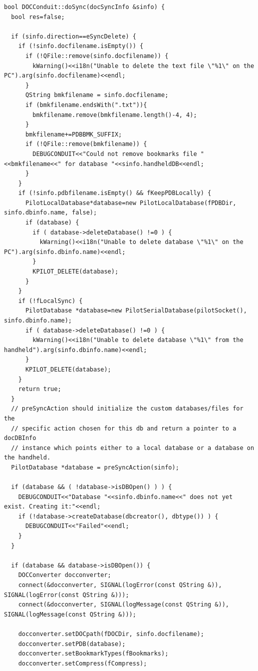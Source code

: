 \documentclass[10pt,a4paper]{article}
\begin{document}
{\footnotesize
\begin{verbatim}
bool DOCConduit::doSync(docSyncInfo &sinfo) {
  bool res=false;
  
  if (sinfo.direction==eSyncDelete) {
    if (!sinfo.docfilename.isEmpty()) {
      if (!QFile::remove(sinfo.docfilename)) {
        kWarning()<<i18n("Unable to delete the text file \"%1\" on the PC").arg(sinfo.docfilename)<<endl;
      }
      QString bmkfilename = sinfo.docfilename;
      if (bmkfilename.endsWith(".txt")){
        bmkfilename.remove(bmkfilename.length()-4, 4);
      }
      bmkfilename+=PDBBMK_SUFFIX;
      if (!QFile::remove(bmkfilename)) {
        DEBUGCONDUIT<<"Could not remove bookmarks file "<<bmkfilename<<" for database "<<sinfo.handheldDB<<endl;
      }
    }
    if (!sinfo.pdbfilename.isEmpty() && fKeepPDBLocally) {
      PilotLocalDatabase*database=new PilotLocalDatabase(fPDBDir, sinfo.dbinfo.name, false);
      if (database) {
        if ( database->deleteDatabase() !=0 ) {
          kWarning()<<i18n("Unable to delete database \"%1\" on the PC").arg(sinfo.dbinfo.name)<<endl;
        }
        KPILOT_DELETE(database);
      }
    }
    if (!fLocalSync) {
      PilotDatabase *database=new PilotSerialDatabase(pilotSocket(), sinfo.dbinfo.name);
      if ( database->deleteDatabase() !=0 ) {
        kWarning()<<i18n("Unable to delete database \"%1\" from the handheld").arg(sinfo.dbinfo.name)<<endl;
      }
      KPILOT_DELETE(database);
    }
    return true;
  }
  // preSyncAction should initialize the custom databases/files for the
  // specific action chosen for this db and return a pointer to a docDBInfo
  // instance which points either to a local database or a database on the handheld.
  PilotDatabase *database = preSyncAction(sinfo);

  if (database && ( !database->isDBOpen() ) ) {
    DEBUGCONDUIT<<"Database "<<sinfo.dbinfo.name<<" does not yet exist. Creating it:"<<endl;
    if (!database->createDatabase(dbcreator(), dbtype()) ) {
      DEBUGCONDUIT<<"Failed"<<endl;
    }
  }

  if (database && database->isDBOpen()) {
    DOCConverter docconverter;
    connect(&docconverter, SIGNAL(logError(const QString &)), SIGNAL(logError(const QString &)));
    connect(&docconverter, SIGNAL(logMessage(const QString &)), SIGNAL(logMessage(const QString &)));

    docconverter.setDOCpath(fDOCDir, sinfo.docfilename);
    docconverter.setPDB(database);
    docconverter.setBookmarkTypes(fBookmarks);
    docconverter.setCompress(fCompress);


\end{verbatim}}
\end{document}
